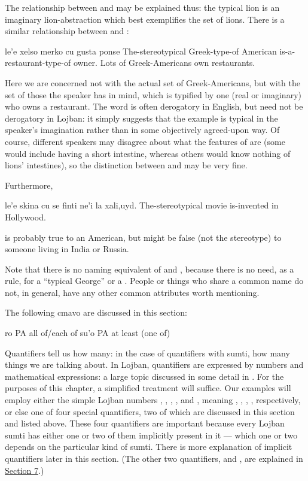 The relationship between  and  may
    be explained thus: the typical lion is an imaginary
    lion-abstraction which best exemplifies the set of lions. There
    is a similar relationship between  and :
\begin{example}
le'e xelso merko\n
\T	cu gusta ponse\n
The-stereotypical Greek-type-of American\n
\T	is-a-restaurant-type-of owner.\n
Lots of Greek-Americans own restaurants.
\end{example}

Here we are concerned not with the actual set of
    Greek-Americans, but with the set of those the speaker has in
    mind, which is typified by one (real or imaginary) who owns a
    restaurant. The word  is often derogatory in
    English, but  need not be derogatory in Lojban: it
    simply suggests that the example is typical in the speaker's
    imagination rather than in some objectively agreed-upon way. Of
    course, different speakers may disagree about what the features
    of  are (some would include having a short
    intestine, whereas others would know nothing of lions'
    intestines), so the distinction between  and
     may be very fine. 

Furthermore,
\begin{example}
le'e skina cu se finti ne'i la xali,uyd.\n
The-stereotypical movie is-invented in Hollywood.
\end{example}

{\noindent}is probably true to an American, but might be false (not the
    stereotype) to someone living in India or Russia. 

Note that there is no naming equivalent of  and
    , because there is no need, as a rule, for a ``typical
    George'' or a . People or things who share a
    common name do not, in general, have any other common
    attributes worth mentioning.



The following cmavo are discussed in this section:

   ro  PA  all of/each of
    su'o    PA  at least (one of)

Quantifiers tell us how many: in the case of quantifiers with
    sumti, how many things we are talking about. In Lojban,
    quantifiers are expressed by numbers and mathematical
    expressions: a large topic discussed in some detail in . For the purposes of this
    chapter, a simplified treatment will suffice. Our examples will
    employ either the simple Lojban numbers , , ,
    , and , meaning , , ,
    ,  respectively, or else one of four special
    quantifiers, two of which are discussed in this section and
    listed above. These four quantifiers are important because
    every Lojban sumti has either one or two of them implicitly
    present in it --- which one or two depends on the particular
    kind of sumti. There is more explanation of implicit
    quantifiers later in this section. (The other two quantifiers,
     and , are explained in \hyperref[sec:6:7]{Section
    7}.) 

